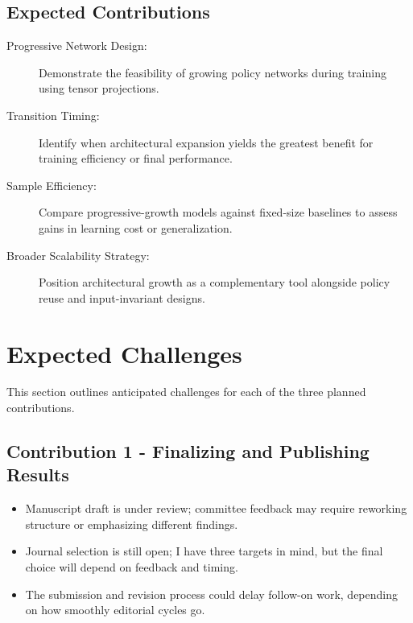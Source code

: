 \subsection{Expected Contributions}
\begin{description}
    \item[Progressive Network Design:] Demonstrate the feasibility of growing 
        policy networks during training using tensor projections.
    \item[Transition Timing:] Identify when architectural expansion yields the 
        greatest benefit for training efficiency or final performance.
    \item[Sample Efficiency:] Compare progressive-growth models against fixed-size 
        baselines to assess gains in learning cost or generalization.
    \item[Broader Scalability Strategy:] Position architectural growth as a 
        complementary tool alongside policy reuse and input-invariant designs.
\end{description}

\section{Expected Challenges}

This section outlines anticipated challenges for each of the three planned contributions.

\subsection*{Contribution 1 - Finalizing and Publishing Results}
\begin{itemize}
    \item Manuscript draft is under review; committee feedback may require 
        reworking structure or emphasizing different findings.
    \item Journal selection is still open; I have three targets in mind, 
        but the final choice will depend on feedback and timing.
    \item The submission and revision process could delay follow-on work, 
        depending on how smoothly editorial cycles go.
\end{itemize}

